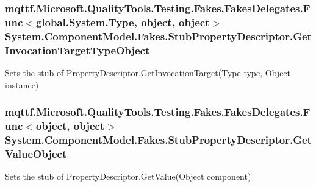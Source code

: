 \hypertarget{class_system_1_1_component_model_1_1_fakes_1_1_stub_property_descriptor_abc451de22806cdd21fa1b1418875fd32}{
\subsubsection[{Get\-Invocation\-Target\-Type\-Object}]{\setlength{\rightskip}{0pt plus 5cm}mqttf.\-Microsoft.\-Quality\-Tools.\-Testing.\-Fakes.\-Fakes\-Delegates.\-Func$<$global.\-System.\-Type, object, object$>$ System.\-Component\-Model.\-Fakes.\-Stub\-Property\-Descriptor.\-Get\-Invocation\-Target\-Type\-Object}}\label{class_system_1_1_component_model_1_1_fakes_1_1_stub_property_descriptor_abc451de22806cdd21fa1b1418875fd32}


Sets the stub of Property\-Descriptor.\-Get\-Invocation\-Target(\-Type type, Object instance)

\hypertarget{class_system_1_1_component_model_1_1_fakes_1_1_stub_property_descriptor_ac9771fcf80b598eb0fbac9c479917c5b}{
\subsubsection[{Get\-Value\-Object}]{\setlength{\rightskip}{0pt plus 5cm}mqttf.\-Microsoft.\-Quality\-Tools.\-Testing.\-Fakes.\-Fakes\-Delegates.\-Func$<$object, object$>$ System.\-Component\-Model.\-Fakes.\-Stub\-Property\-Descriptor.\-Get\-Value\-Object}}\label{class_system_1_1_component_model_1_1_fakes_1_1_stub_property_descriptor_ac9771fcf80b598eb0fbac9c479917c5b}


Sets the stub of Property\-Descriptor.\-Get\-Value(\-Object component)

